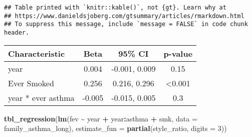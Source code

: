 \documentclass[
]{article}
\newenvironment{Shaded}{\begin{snugshade}}{\end{snugshade}}
\newcommand{\AttributeTok}[1]{\textcolor[rgb]{0.13,0.29,0.53}{#1}}
\newcommand{\DecValTok}[1]{\textcolor[rgb]{0.00,0.00,0.81}{#1}}
\newcommand{\FunctionTok}[1]{\textcolor[rgb]{0.13,0.29,0.53}{\textbf{#1}}}
\newcommand{\NormalTok}[1]{#1}
\newcommand{\OtherTok}[1]{\textcolor[rgb]{0.56,0.35,0.01}{#1}}
\newcommand{\SpecialCharTok}[1]{\textcolor[rgb]{0.81,0.36,0.00}{\textbf{#1}}}
\newcommand{\StringTok}[1]{\textcolor[rgb]{0.31,0.60,0.02}{#1}}
\begin{document}
\begin{Shaded}
\end{Shaded}

\begin{verbatim}
## Table printed with `knitr::kable()`, not {gt}. Learn why at
## https://www.danieldsjoberg.com/gtsummary/articles/rmarkdown.html
## To suppress this message, include `message = FALSE` in code chunk header.
\end{verbatim}

\begin{longtable}[]{@{}lccc@{}}
\toprule\noalign{}
\textbf{Characteristic} & \textbf{Beta} & \textbf{95\% CI} &
\textbf{p-value} \\
\midrule\noalign{}
\endhead
\bottomrule\noalign{}
\endlastfoot
year & 0.004 & -0.001, 0.009 & 0.15 \\
Ever Smoked & 0.256 & 0.216, 0.296 & \textless0.001 \\
year * ever asthma & -0.005 & -0.015, 0.005 & 0.3 \\
\end{longtable}

\begin{Shaded}
\begin{Highlighting}[]
\FunctionTok{tbl\_regression}\NormalTok{(}\FunctionTok{lm}\NormalTok{(fev }\SpecialCharTok{\textasciitilde{}}\NormalTok{ year }\SpecialCharTok{+}\NormalTok{ year}\SpecialCharTok{:}\NormalTok{asthma }\SpecialCharTok{+}\NormalTok{ smk,}
                  \AttributeTok{data =}\NormalTok{ family\_asthma\_long),}
               \AttributeTok{estimate\_fun =} \FunctionTok{partial}\NormalTok{(style\_ratio, }\AttributeTok{digits =} \DecValTok{3}\NormalTok{))}
\end{Highlighting}
\end{Shaded}
\end{document}
